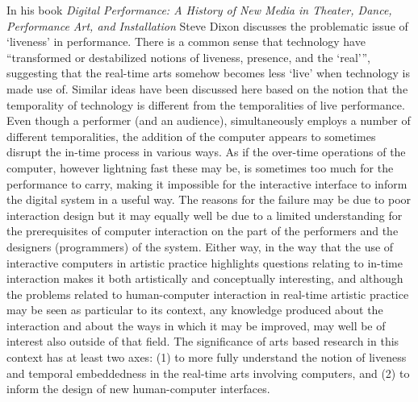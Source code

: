 \documentclass{article}
\begin{document}
In his book \emph{Digital Performance: A History of New Media in Theater, Dance, Performance Art, and Installation} Steve Dixon discusses the problematic issue of `liveness' in performance. There is a common sense that technology have ``transformed or destabilized notions of liveness, presence, and the `real''', \citep[127]{dixon07} suggesting that the real-time arts somehow becomes less `live' when technology is made use of. Similar ideas have been discussed here based on the notion that the temporality of technology is different from the temporalities of live performance. Even though a performer (and an audience), simultaneously employs a number of different temporalities, the addition of the computer appears to sometimes disrupt the in-time process in various ways. As if the over-time operations of the computer, however lightning fast these may be, is sometimes too much for the performance to carry, making it impossible for the interactive interface to inform the digital system in a useful way. The reasons for the failure may be due to poor interaction design but it may equally well be due to a limited understanding for the prerequisites of computer interaction on the part of the performers and the designers (programmers) of the system. Either way, in the way that the use of interactive computers in artistic practice highlights questions relating to in-time interaction makes it both artistically and conceptually interesting, and although the problems related to human-computer interaction in real-time artistic practice may be seen as particular to its context, any knowledge produced about the interaction and about the ways in which it may be improved, may well be of interest also outside of that field. The significance of arts based research in this context has at least two axes: (1) to more fully understand the notion of liveness and temporal embeddedness in the real-time arts involving computers, and (2) to inform the design of new human-computer interfaces.



\end{document}

